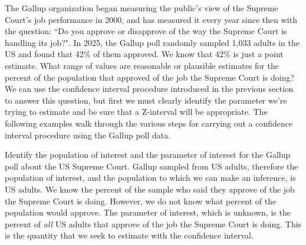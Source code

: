 The Gallup organization began measuring the public's view of the Supreme Court's job performance in 2000, and has measured it every year since then with the question: ``Do you approve or disapprove of the way the Supreme Court is handling its job?".  In 2025, the Gallup poll randomly sampled 1,033 adults in the US and found that 42\% of them approved.
We know that 42\% is just a point estimate.  What range of values are reasonable or plausible estimates for the percent of the population that approved of the job the Supreme Court is doing?  We can use the confidence interval procedure introduced in the previous section to answer this question, but first we must clearly identify the parameter we're trying to estimate and be sure that a Z-interval will be appropriate.  The following examples walk through the various steps for carrying out a confidence interval procedure using the Gallup poll data.

\begin{examplewrap}
\begin{nexample}{Identify the population of interest and the parameter of interest for the Gallup poll about the US Supreme Court. }
Gallup sampled from US adults, therefore the population of interest, and the population to which we can make an inference, is US adults.  We know the percent of the sample who said they approve of the job the Supreme Court is doing.  However, we do not know what percent of the population would approve.  The parameter of interest, which is unknown, is the percent of \emph{all} US adults that approve of the job the Supreme Court is doing.  This is the quantity that we seek to estimate with the confidence interval.
\end{nexample}
\end{examplewrap}


\D{\newpage}

